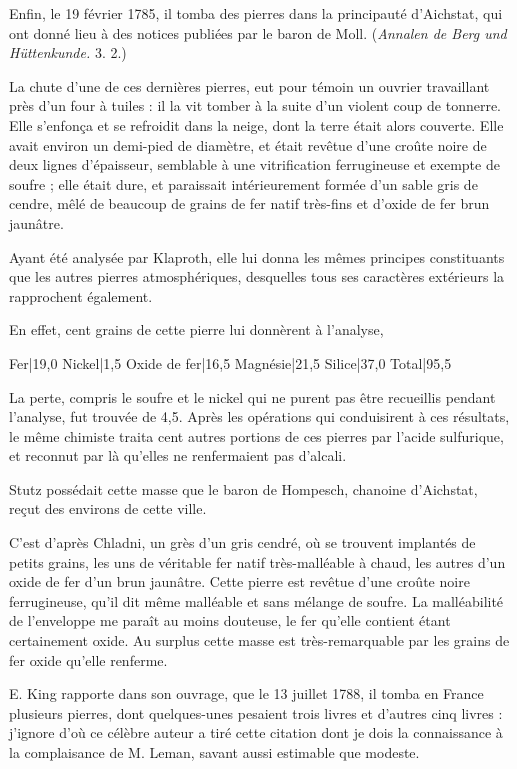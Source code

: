 \documentclass[a4paper, 12pt, oneside, french]{article}
\begin{document}
Enfin, le 19 février 1785, il tomba des pierres dans la principauté d'Aichstat, qui ont donné lieu à des notices publiées par le baron de Moll. (\emph{Annalen de Berg und Hüttenkunde.} 3. 2.)

La chute d'une de ces dernières pierres, eut pour témoin un ouvrier travaillant près d'un four à tuiles : il la vit tomber à la suite d'un violent coup de tonnerre. Elle s'enfonça et se refroidit dans la neige, dont la terre était alors couverte. Elle avait environ un demi-pied de diamètre, et était revêtue d'une croûte noire de deux lignes d'épaisseur, semblable à une vitrification ferrugineuse et exempte de soufre ; elle était dure, et paraissait intérieurement formée d'un sable gris de cendre, mêlé de beaucoup de grains de fer natif très-fins et d'oxide de fer brun jaunâtre.

Ayant été analysée par Klaproth, elle lui donna les mêmes principes constituants que les autres pierres atmosphériques, desquelles tous ses caractères extérieurs la rapprochent également.

En effet, cent grains de cette pierre lui donnèrent à l'analyse,

Fer|19,0  
Nickel|1,5  
Oxide de fer|16,5  
Magnésie|21,5  
Silice|37,0  
Total|95,5

La perte, compris le soufre et le nickel qui ne purent pas être recueillis pendant l'analyse, fut trouvée de 4,5. Après les opérations qui conduisirent à ces résultats, le même chimiste traita cent autres portions de ces pierres par l'acide sulfurique, et reconnut par là qu'elles ne renfermaient pas d'alcali.

Stutz possédait cette masse que le baron de Hompesch, chanoine d'Aichstat, reçut des environs de cette ville.

C'est d'après Chladni, un grès d'un gris cendré, où se trouvent implantés de petits grains, les uns de véritable fer natif très-malléable à chaud, les autres d'un oxide de fer d'un brun jaunâtre. Cette pierre est revêtue d'une croûte noire ferrugineuse, qu'il dit même malléable et sans mélange de soufre. La malléabilité de l'enveloppe me paraît au moins douteuse, le fer qu'elle contient étant certainement oxide. Au surplus cette masse est très-remarquable par les grains de fer oxide qu'elle renferme.

E. King rapporte dans son ouvrage, que le 13 juillet 1788, il tomba en France plusieurs pierres, dont quelques-unes pesaient trois livres et d'autres cinq livres : j'ignore d'où ce célèbre auteur a tiré cette citation dont je dois la connaissance à la complaisance de M. Leman, savant aussi estimable que modeste.
\end{document}
